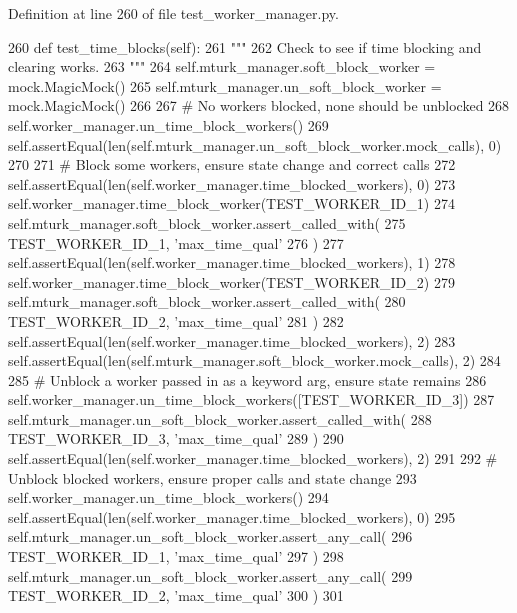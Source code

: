 Definition at line 260 of file test\+\_\+worker\+\_\+manager.\+py.


\begin{DoxyCode}
260     \textcolor{keyword}{def }test\_time\_blocks(self):
261         \textcolor{stringliteral}{"""}
262 \textcolor{stringliteral}{        Check to see if time blocking and clearing works.}
263 \textcolor{stringliteral}{        """}
264         self.mturk\_manager.soft\_block\_worker = mock.MagicMock()
265         self.mturk\_manager.un\_soft\_block\_worker = mock.MagicMock()
266 
267         \textcolor{comment}{# No workers blocked, none should be unblocked}
268         self.worker\_manager.un\_time\_block\_workers()
269         self.assertEqual(len(self.mturk\_manager.un\_soft\_block\_worker.mock\_calls), 0)
270 
271         \textcolor{comment}{# Block some workers, ensure state change and correct calls}
272         self.assertEqual(len(self.worker\_manager.time\_blocked\_workers), 0)
273         self.worker\_manager.time\_block\_worker(TEST\_WORKER\_ID\_1)
274         self.mturk\_manager.soft\_block\_worker.assert\_called\_with(
275             TEST\_WORKER\_ID\_1, \textcolor{stringliteral}{'max\_time\_qual'}
276         )
277         self.assertEqual(len(self.worker\_manager.time\_blocked\_workers), 1)
278         self.worker\_manager.time\_block\_worker(TEST\_WORKER\_ID\_2)
279         self.mturk\_manager.soft\_block\_worker.assert\_called\_with(
280             TEST\_WORKER\_ID\_2, \textcolor{stringliteral}{'max\_time\_qual'}
281         )
282         self.assertEqual(len(self.worker\_manager.time\_blocked\_workers), 2)
283         self.assertEqual(len(self.mturk\_manager.soft\_block\_worker.mock\_calls), 2)
284 
285         \textcolor{comment}{# Unblock a worker passed in as a keyword arg, ensure state remains}
286         self.worker\_manager.un\_time\_block\_workers([TEST\_WORKER\_ID\_3])
287         self.mturk\_manager.un\_soft\_block\_worker.assert\_called\_with(
288             TEST\_WORKER\_ID\_3, \textcolor{stringliteral}{'max\_time\_qual'}
289         )
290         self.assertEqual(len(self.worker\_manager.time\_blocked\_workers), 2)
291 
292         \textcolor{comment}{# Unblock blocked workers, ensure proper calls and state change}
293         self.worker\_manager.un\_time\_block\_workers()
294         self.assertEqual(len(self.worker\_manager.time\_blocked\_workers), 0)
295         self.mturk\_manager.un\_soft\_block\_worker.assert\_any\_call(
296             TEST\_WORKER\_ID\_1, \textcolor{stringliteral}{'max\_time\_qual'}
297         )
298         self.mturk\_manager.un\_soft\_block\_worker.assert\_any\_call(
299             TEST\_WORKER\_ID\_2, \textcolor{stringliteral}{'max\_time\_qual'}
300         )
301 
\end{DoxyCode}


